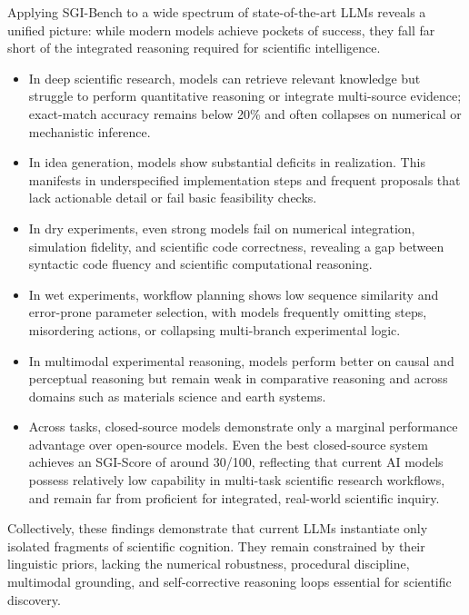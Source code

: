 Applying SGI-Bench to a wide spectrum of state-of-the-art LLMs reveals a unified picture: while modern models achieve pockets of success, they fall far short of the integrated reasoning required for scientific intelligence.
\begin{itemize}

\item In deep scientific research, models can retrieve relevant knowledge but struggle to perform quantitative reasoning or integrate multi-source evidence; exact-match accuracy remains below 20\% and often collapses on numerical or mechanistic inference.

\item  In idea generation, models show substantial deficits in realization. This manifests in underspecified implementation steps and frequent proposals that lack actionable detail or fail basic feasibility checks.

\item  In dry experiments, even strong models fail on numerical integration, simulation fidelity, and scientific code correctness, revealing a gap between syntactic code fluency and scientific computational reasoning.

\item In wet experiments, workflow planning shows low sequence similarity and error-prone parameter selection, with models frequently omitting steps, misordering actions, or collapsing multi-branch experimental logic.

\item In multimodal experimental reasoning, models perform better on causal and perceptual reasoning but remain weak in comparative reasoning and across domains such as materials science and earth systems.

\item Across tasks, closed-source models demonstrate only a marginal performance advantage over open-source models. Even the best closed-source system achieves an SGI-Score of around 30/100, reflecting that current AI models possess relatively low capability in multi-task scientific research workflows, and remain far from proficient for integrated, real-world scientific inquiry.

\end{itemize}

Collectively, these findings demonstrate that current LLMs instantiate only isolated fragments of scientific cognition. They remain constrained by their linguistic priors, lacking the numerical robustness, procedural discipline, multimodal grounding, and self-corrective reasoning loops essential for scientific discovery. 


